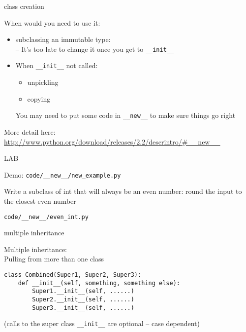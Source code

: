 \documentclass{beamer}
\begin{document}
\begin{frame}[fragile]{class creation}

{\Large When would  you need to use it:}

\begin{itemize}
  \item subclassing an immutable type:\\
   -- It's too late to change it once you get to \verb|__init__|

  \item When \verb|__init__| not called:
  \begin{itemize}
    \item unpickling
    \item copying
  \end{itemize}

  {\large You may need to put some code in \verb|__new__| to make sure things go right} 

\end{itemize}

\vfill
{\large More detail here:}
\url{http://www.python.org/download/releases/2.2/descrintro/#__new__}
\end{frame} 

\begin{frame}[fragile]{LAB}

{\large Demo: \verb|code/__new__/new_example.py|}

\vfill
{\Large Write a subclass of int that will always be an even number: round the input to the closest even number}

\vfill
{\large \verb|code/__new__/even_int.py|}

\vfill
\end{frame}


\begin{frame}[fragile]{multiple inheritance}

{\Large Multiple inheritance:\\
\hspace{0.2in} Pulling from more than one class}

\vfill
\begin{verbatim}
class Combined(Super1, Super2, Super3):
    def __init__(self, something, something else):
        Super1.__init__(self, ......)        
        Super2.__init__(self, ......)        
        Super3.__init__(self, ......)        
\end{verbatim}
(calls to the super class \verb|__init__| are optional -- case dependent)

\end{frame} 
\end{document}
